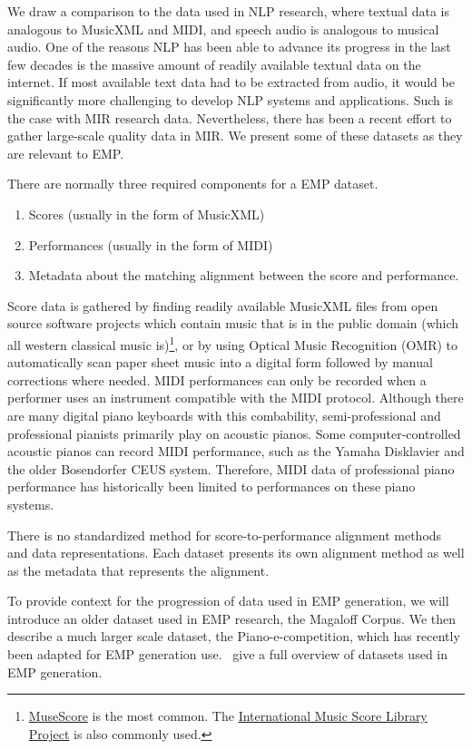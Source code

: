 We draw a comparison to the data used in NLP research, where textual data is analogous to MusicXML and MIDI, and speech audio is analogous to musical audio. One of the reasons NLP has been able to advance its progress in the last few decades is the massive amount of readily available textual data on the internet. If most available text data had to be extracted from audio, it would be significantly more challenging to develop NLP systems and applications. Such is the case with MIR research data. Nevertheless, there has been a recent effort to gather large-scale quality data in MIR. We present some of these datasets as they are relevant to EMP. 

There are normally three required components for a EMP dataset. 
\begin{enumerate}
    \item Scores (usually in the form of MusicXML)
    \item Performances (usually in the form of MIDI)
    \item Metadata about the matching alignment between the score and performance. 
\end{enumerate}
Score data is gathered by finding readily available MusicXML files from open source software projects which contain music that is in the public domain (which all western classical music is)\footnote{\href{https://musescore.com}{MuseScore} is the most common. The \href{https://imslp.org/wiki/Main_Page}{International Music Score Library Project} is also commonly used.}, or by using Optical Music Recognition (OMR) to automatically scan paper sheet music into a digital form followed by manual corrections where needed. MIDI performances can only be recorded when a performer uses an instrument compatible with the MIDI protocol. Although there are many digital piano keyboards with this combability, semi-professional and professional pianists primarily play on acoustic pianos. Some computer-controlled acoustic pianos can record MIDI performance, such as the Yamaha Disklavier and the older Bosendorfer CEUS system. Therefore, MIDI data of professional piano performance has historically been limited to performances on these piano systems. 

There is no standardized method for score-to-performance alignment methods and data representations. Each dataset presents its own alignment method as well as the metadata that represents the alignment. 

To provide context for the progression of data used in EMP generation, we will introduce an older dataset used in EMP research, the Magaloff Corpus. We then describe a much larger scale dataset, the Piano-e-competition, which has recently been adapted for EMP generation use.~\citet{cancino2018computational} give a full overview of datasets used in EMP generation. 

